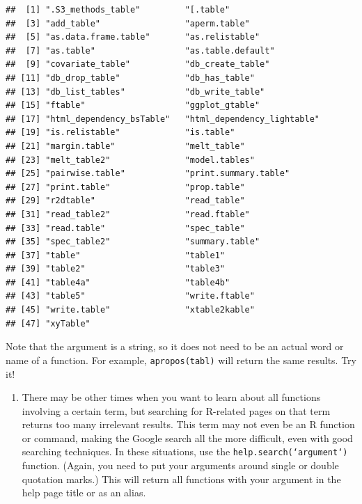 \documentclass[]{book}
\providecommand{\tightlist}{%
  \setlength{\itemsep}{0pt}\setlength{\parskip}{0pt}}
\begin{document}
\begin{verbatim}
##  [1] ".S3_methods_table"         "[.table"                  
##  [3] "add_table"                 "aperm.table"              
##  [5] "as.data.frame.table"       "as.relistable"            
##  [7] "as.table"                  "as.table.default"         
##  [9] "covariate_table"           "db_create_table"          
## [11] "db_drop_table"             "db_has_table"             
## [13] "db_list_tables"            "db_write_table"           
## [15] "ftable"                    "ggplot_gtable"            
## [17] "html_dependency_bsTable"   "html_dependency_lightable"
## [19] "is.relistable"             "is.table"                 
## [21] "margin.table"              "melt_table"               
## [23] "melt_table2"               "model.tables"             
## [25] "pairwise.table"            "print.summary.table"      
## [27] "print.table"               "prop.table"               
## [29] "r2dtable"                  "read_table"               
## [31] "read_table2"               "read.ftable"              
## [33] "read.table"                "spec_table"               
## [35] "spec_table2"               "summary.table"            
## [37] "table"                     "table1"                   
## [39] "table2"                    "table3"                   
## [41] "table4a"                   "table4b"                  
## [43] "table5"                    "write.ftable"             
## [45] "write.table"               "xtable2kable"             
## [47] "xyTable"
\end{verbatim}

Note that the argument is a string, so it does not need to be an actual
word or name of a function. For example,
\texttt{apropos(\textquotesingle{}tabl\textquotesingle{})} will return
the same results. Try it!

\begin{enumerate}
\def\labelenumi{\arabic{enumi}.}
\setcounter{enumi}{3}
\tightlist
\item
  There may be other times when you want to learn about all functions
  involving a certain term, but searching for R-related pages on that
  term returns too many irrelevant results. This term may not even be an
  R function or command, making the Google search all the more
  difficult, even with good searching techniques. In these situations,
  use the \texttt{help.search(‘argument‘)} function. (Again, you need to
  put your arguments around single or double quotation marks.) This will
  return all functions with your argument in the help page title or as
  an alias.
\end{enumerate}
\end{document}
